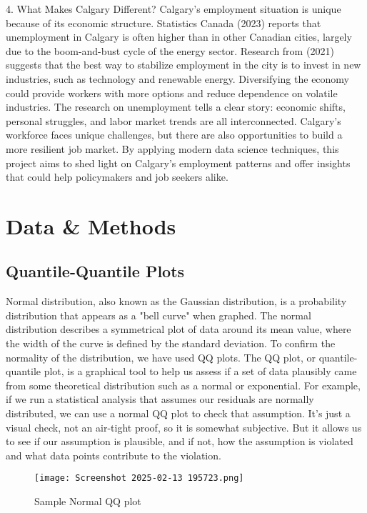 \documentclass[11pt]{article}
\begin{document}
4. What Makes Calgary Different?\newline
Calgary’s employment situation is unique because of its economic structure. Statistics Canada (2023) reports that unemployment in Calgary is often higher than in other Canadian cities, largely due to the boom-and-bust cycle of the energy sector. Research from \cite{ucalgary2021economic} (2021) suggests that the best way to stabilize employment in the city is to invest in new industries, such as technology and renewable energy. Diversifying the economy could provide workers with more options and reduce dependence on volatile industries.
\newline
The research on unemployment tells a clear story: economic shifts, personal struggles, and labor market trends are all interconnected. Calgary’s workforce faces unique challenges, but there are also opportunities to build a more resilient job market. By applying modern data science techniques, this project aims to shed light on Calgary’s employment patterns and offer insights that could help policymakers and job seekers alike.

\section{Data \& Methods}
\subsection{Quantile-Quantile Plots}
Normal distribution, also known as the Gaussian distribution, is a probability distribution that appears as a "bell curve" when graphed. The normal distribution describes a symmetrical plot of data around its mean value, where the width of the curve is defined by the standard deviation. To confirm the normality of the distribution, we have used QQ plots. The QQ plot, or quantile-quantile plot, is a graphical tool to help us assess if a set of data plausibly came from some theoretical distribution such as a normal or exponential. For example, if we run a statistical analysis that assumes our residuals are normally distributed, we can use a normal QQ plot to check that assumption. It's just a visual check, not an air-tight proof, so it is somewhat subjective. But it allows us to see if our assumption is plausible, and if not, how the assumption is violated and what data points contribute to the violation.\cite{qqplot_uvlibrary}
\begin{figure}[h]
    \centering
    \texttt{[image: Screenshot 2025-02-13 195723.png]}
    \caption{Sample Normal QQ plot}
    \label{fig:enter-label}
\end{figure}
\end{document}
